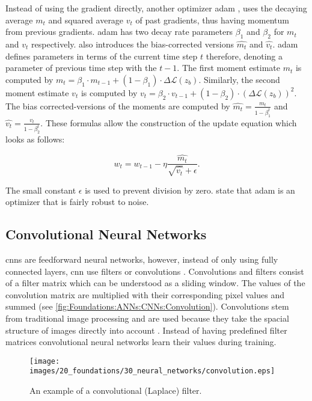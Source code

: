 Instead of using the gradient directly, another optimizer \ac{adam} \cite{kingma2017adam}, uses the decaying average $m_t$ and squared average $v_t$ of past gradients, thus having momentum from previous gradients. \Ac{adam} has two decay rate parameters $\beta_1$ and $\beta_2$ for $m_t$ and $v_t$ respectively. \textcite{kingma2017adam} also introduces the bias-corrected versions $\hat{m_t}$ and $\hat{v_t}$. \Ac{adam} defines parameters in terms of the current time step $t$ therefore, denoting a parameter of previous time step with the $t-1$. The first moment estimate $m_t$ is computed by $m_t = \beta_1 \cdot m_{t-1} + (1 - \beta_1) \cdot \Delta \mathcal{L}(z_b)$. Similarly, the second moment estimate $v_t$ is computed by $v_t = \beta_2 \cdot v_{t-1} + (1 - \beta_2) \cdot (\Delta \mathcal{L}(z_b))^2$. 
The bias corrected-versions of the moments are computed by $\hat{m_t} = \frac{m_t}{1 - \beta_1^t}$ and $\hat{v_t} = \frac{v_t}{1 - \beta_2^t}$. These formulas allow the construction of the update equation which looks as follows:

$$w_t = w_{t-1} - \eta \frac{\hat{m_t}}{\sqrt{\hat{v_t}} + \epsilon} \text{.}$$

The small constant $\epsilon$ is used to prevent division by zero. \textcite{kingma2017adam} state that \ac{adam} is an optimizer that is fairly robust to noise.


\subsection{Convolutional Neural Networks}
\label{sec:Foundations:NeuralNetworks:CNN}

\Acp{cnn} are feedforward neural networks, however, instead of only using fully connected layers, \ac{cnn} use filters or convolutions \cite{teuwen2020convolutional}. Convolutions and filters consist of a filter matrix which can be understood as a sliding window. The values of the convolution matrix are multiplied with their corresponding pixel values and summed (see \autoref{fig:Foundations:ANNs:CNNs:Convolution}). Convolutions stem from traditional image processing \cite{shih2010image} and are used because they take the spacial structure of images directly into account \cite{nielsen2015neural}. Instead of having predefined filter matrices convolutional neural networks learn their values during training.

\begin{figure}
    \centering
    \texttt{[image: images/20\_foundations/30\_neural\_networks/convolution.eps]}
    \caption{An example of a convolutional (Laplace) filter.}
    \label{fig:Foundations:ANNs:CNNs:Convolution}
\end{figure}


